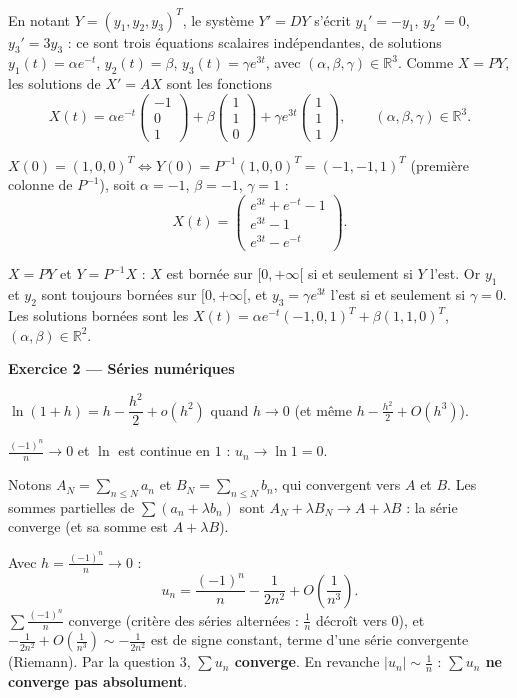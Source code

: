 \documentclass[a4paper,11pt]{article}
\numberwithin{equation}{section}
\numberwithin{figure}{section}
\numberwithin{table}{section}
\theoremstyle{enonce}
\theoremstyle{exemple}
\theoremstyle{remarque}
\newcommand{\R}{\mathbb{R}}
\newcommand{\Partie}[1]{\par\needspace{5\baselineskip}\vspace{1.1em}\noindent
  {\sffamily\bfseries\large\color{Bleu}#1}\par\vspace{2pt}{\color{Filet}\rule{\linewidth}{0.4pt}}\par\smallskip}
\newcommand{\Q}[1]{\par\needspace{3\baselineskip}\medskip\noindent{\sffamily\bfseries\color{Bleu}#1}\enspace}
\begin{document}
\Q{5.(b)} En notant $Y=(y_1,y_2,y_3)^T$, le système $Y'=DY$ s'écrit $y_1'=-y_1$, $y_2'=0$, $y_3'=3y_3$ : ce sont trois équations scalaires
indépendantes, de solutions $y_1(t)=\alpha e^{-t}$, $y_2(t)=\beta$, $y_3(t)=\gamma e^{3t}$, avec $(\alpha,\beta,\gamma)\in\R^3$. Comme $X=PY$, les solutions de
$X'=AX$ sont les fonctions
\[X(t)=\alpha e^{-t}\begin{pmatrix}-1\\0\\1\end{pmatrix}+\beta\begin{pmatrix}1\\1\\0\end{pmatrix}+\gamma e^{3t}\begin{pmatrix}1\\1\\1\end{pmatrix},\qquad(\alpha,\beta,\gamma)\in\R^3.\]

\Q{5.(c)} $X(0)=(1,0,0)^T\iff Y(0)=P^{-1}(1,0,0)^T=(-1,-1,1)^T$ (première colonne de $P^{-1}$), soit $\alpha=-1$, $\beta=-1$, $\gamma=1$ :
\[X(t)=\begin{pmatrix}e^{3t}+e^{-t}-1\\e^{3t}-1\\e^{3t}-e^{-t}\end{pmatrix}.\]

\Q{5.(d)} $X=PY$ et $Y=P^{-1}X$ : $X$ est bornée sur $[0,+\infty[$ si et seulement si $Y$ l'est. Or $y_1$ et $y_2$ sont toujours bornées sur $[0,+\infty[$,
et $y_3=\gamma e^{3t}$ l'est si et seulement si $\gamma=0$. Les solutions bornées sont les $X(t)=\alpha e^{-t}(-1,0,1)^T+\beta(1,1,0)^T$, $(\alpha,\beta)\in\R^2$.

\Partie{Exercice 2 — Séries numériques}

\Q{1.} $\ln(1+h)=h-\dfrac{h^2}2+o(h^2)$ quand $h\to0$ (et même $h-\frac{h^2}2+O(h^3)$).

\Q{2.} $\frac{(-1)^n}n\to0$ et $\ln$ est continue en $1$ : $u_n\to\ln1=0$.

\Q{3.} Notons $A_N=\sum_{n\leq N}a_n$ et $B_N=\sum_{n\leq N}b_n$, qui convergent vers $A$ et $B$. Les sommes partielles de $\sum(a_n+\lambda b_n)$ sont
$A_N+\lambda B_N\to A+\lambda B$ : la série converge (et sa somme est $A+\lambda B$).

\Q{4.} Avec $h=\frac{(-1)^n}n\to0$ :
\[u_n=\frac{(-1)^n}n-\frac1{2n^2}+O\left(\frac1{n^3}\right).\]
$\sum\frac{(-1)^n}n$ converge (critère des séries alternées : $\frac1n$ décroît vers $0$), et $-\frac1{2n^2}+O\left(\frac1{n^3}\right)\sim-\frac1{2n^2}$ est de signe
constant, terme d'une série convergente (Riemann). Par la question 3, \textbf{$\sum u_n$ converge}. En revanche $|u_n|\sim\frac1n$ : \textbf{$\sum u_n$
ne converge pas absolument}.
\end{document}
